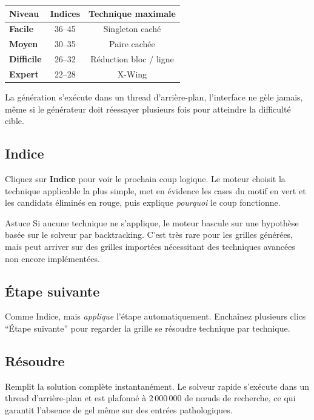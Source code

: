 \begin{center}
\begin{tabular}{>{\color{darkblue}\bfseries}l c c}
\rowcolor{lightblue}
Niveau     & Indices & Technique maximale \\
\hline
Facile     & 36--45 & Singleton caché \\
\rowcolor{softgray}
Moyen      & 30--35 & Paire cachée \\
Difficile  & 26--32 & Réduction bloc / ligne \\
\rowcolor{softgray}
Expert     & 22--28 & X-Wing \\
\end{tabular}
\end{center}

La génération s'exécute dans un thread d'arrière-plan, l'interface ne
gèle jamais, même si le générateur doit réessayer plusieurs fois pour
atteindre la difficulté cible.

\subsection{Indice}

Cliquez sur \textbf{Indice} pour voir le prochain coup logique. Le
moteur choisit la technique applicable la plus simple, met en évidence
les cases du motif en vert et les candidats éliminés en rouge, puis
explique \emph{pourquoi} le coup fonctionne.

\begin{tipbox}{Astuce}
Si aucune technique ne s'applique, le moteur bascule sur une hypothèse
basée sur le solveur par backtracking. C'est très rare pour les grilles
générées, mais peut arriver sur des grilles importées nécessitant des
techniques avancées non encore implémentées.
\end{tipbox}

\subsection{Étape suivante}

Comme Indice, mais \emph{applique} l'étape automatiquement. Enchaînez
plusieurs clics ``Étape suivante'' pour regarder la grille se résoudre
technique par technique.

\subsection{Résoudre}

Remplit la solution complète instantanément. Le solveur rapide
s'exécute dans un thread d'arrière-plan et est plafonné à 2\,000\,000
de n\oe uds de recherche, ce qui garantit l'absence de gel même sur des
entrées pathologiques.

